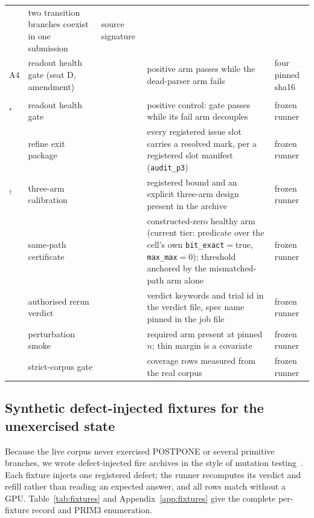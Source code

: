 \documentclass{article}
\begin{document}
\begin{table}[t]
\begin{tabular}{@{}L{82pt} L{50pt} L{78pt} L{112pt} L{50pt}@{}}
   & two transition branches coexist in one submission & source signature \\
A4 & readout health gate (seat D, amendment)
   & 
   & positive arm passes while the dead-parser arm fails & four pinned sha16 \\
\addlinespace[2pt]
\midrule
{}\\
\addlinespace[1pt]
$^\star$ & readout health gate & 
   & positive control: gate passes while its fail arm decouples & frozen runner \\
 & refine exit package & 
   & every registered issue slot carries a resolved mark, per a registered slot manifest
     (\texttt{audit\_p3}) & frozen runner \\
$^\dagger$ & three-arm calibration & 
   & registered bound and an explicit three-arm design present in the archive
     & frozen runner \\
 & same-path certificate
   & 
   & constructed-zero healthy arm (current tier: predicate over the cell's own
     \texttt{bit\_exact}${}={}$true, \texttt{max\_max}${}={}0$); threshold anchored by the
     mismatched-path arm alone
   & frozen runner \\
 & authorised rerun verdict & 
   & verdict keywords and trial id in the verdict file, spec name pinned in the job
     file & frozen runner \\
 & perturbation smoke & 
   & required arm present at pinned $n$; thin margin is a covariate & frozen runner \\
 & strict-corpus gate & 
   & coverage rows measured from the real corpus & frozen runner \\
\bottomrule
\end{tabular}
\end{table}

\subsection{Synthetic defect-injected fixtures for the unexercised state}
\label{sec:fixtures}

Because the live corpus never exercised POSTPONE or several primitive branches, we wrote
defect-injected fire archives in the style of mutation testing~\citep{jia2011analysis}. Each
fixture injects one registered defect; the runner recomputes its verdict and refill rather
than reading an expected answer, and all rows match without a GPU. Table~\ref{tab:fixtures}
and Appendix~\ref{app:fixtures} give the complete per-fixture record and PRIM3 enumeration.
\end{document}
